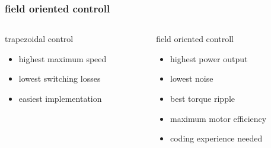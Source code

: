 \documentclass{beamer}
\begin{document}
\begin{frame}
  
  \frametitle{field oriented controll}    



  \begin{columns}

    \begin{column}{0.5\textwidth}
      trapezoidal control
      \begin{itemize}
        \item highest maximum speed
        \item lowest switching losses
        \item easiest implementation
      \end{itemize}
    \end{column}

    \begin{column}{0.5\textwidth}
      field oriented controll
      \begin{itemize}
        \item highest power output
        \item lowest noise
        \item best torque ripple
        \item maximum motor efficiency
        \item coding experience needed
      \end{itemize}
    \end{column}

  \end{columns}
  
\end{frame}
\end{document}
